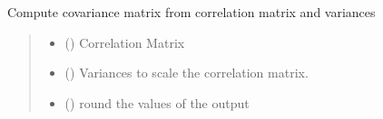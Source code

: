 \documentclass[letterpaper,10pt,english]{sphinxmanual}
\begin{document}
\begin{fulllineitems}
\label{\detokenize{misc:glomar_gridding.utils.cor_2_cov}}
\pysigstartsignatures
\pysiglinewithargsret
{}
{\sphinxparamcomma {}\sphinxparamcomma {}}
{}
\pysigstopsignatures
\sphinxAtStartPar
Compute covariance matrix from correlation matrix and variances
\begin{quote}\begin{description}
\begin{itemize}
\item {}
\sphinxAtStartPar
{} () \textendash{} Correlation Matrix

\item {}
\sphinxAtStartPar
{} () \textendash{} Variances to scale the correlation matrix.

\item {}
\sphinxAtStartPar
{} () \textendash{} round the values of the output

\end{itemize}

\sphinxAtStartPar
{}

\end{description}\end{quote}

\end{fulllineitems}

\end{document}
